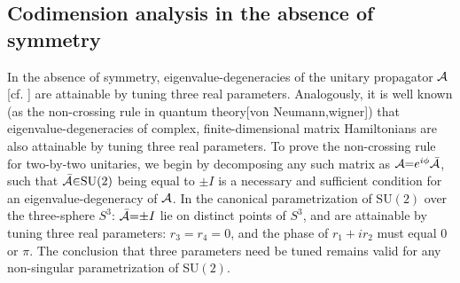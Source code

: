 \documentclass[aps, prb, showpacs, twocolumn, notitlepage, superscriptaddress]{revtex4-1}
\begin{document}





\subsection{Codimension analysis in the absence of symmetry}


In the absence of symmetry,  eigenvalue-degeneracies of the unitary propagator ${\cal A}$ [cf. ] are attainable by tuning three real parameters. Analogously, it is well known (as the non-crossing rule in quantum theory[von Neumann,wigner]) that eigenvalue-degeneracies of complex, finite-dimensional matrix Hamiltonians are also attainable by tuning three real parameters.
 To prove the non-crossing rule for two-by-two unitaries, we begin by decomposing any such matrix as ${\cal A}{=}e^{i\phi}{\cal \bar{A}}$, such that  ${\cal \bar{A}}{\in}\text{SU}(2)$ being equal to $\pm I$ is a necessary and sufficient condition for an eigenvalue-degeneracy of ${\cal A}$. In the canonical parametrization of $\text{SU}(2)$ over the three-sphere $S^3$: 
${\cal \bar{A}}{=}{\pm}I$ lie on distinct points of $S^3$, and are attainable by tuning three real parameters: $r_3{=}r_4{=}0$, and the phase of $r_1{+}ir_2$ must equal $0$ or $\pi$. The conclusion that three parameters need be tuned remains valid for any  non-singular parametrization of SU$(2)$.


 
\end{document}
